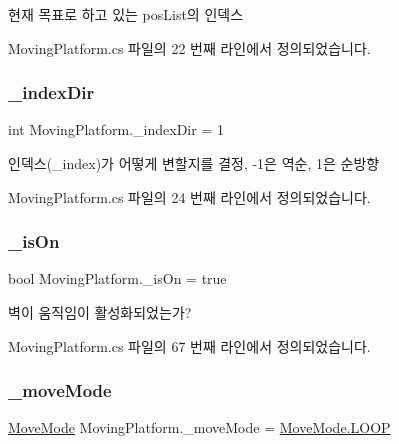현재 목표로 하고 있는 pos\+List의 인덱스 



Moving\+Platform.\+cs 파일의 22 번째 라인에서 정의되었습니다.

\mbox{\label{class_moving_platform_a885973335ac91f8c34289d38f2d88d93}} 
\subsubsection{\texorpdfstring{\_indexDir}{\_indexDir}}
{\footnotesize\ttfamily int Moving\+Platform.\+\_\+index\+Dir = 1\hspace{0.3cm}{\ttfamily [private]}}



인덱스(\+\_\+index)가 어떻게 변할지를 결정, -\/1은 역순, 1은 순방향 



Moving\+Platform.\+cs 파일의 24 번째 라인에서 정의되었습니다.

\mbox{\label{class_moving_platform_a6721f91607e56294fb807a00ccfaafad}} 
\subsubsection{\texorpdfstring{\_isOn}{\_isOn}}
{\footnotesize\ttfamily bool Moving\+Platform.\+\_\+is\+On = true\hspace{0.3cm}{\ttfamily [private]}}



벽이 움직임이 활성화되었는가? 



Moving\+Platform.\+cs 파일의 67 번째 라인에서 정의되었습니다.

\mbox{\label{class_moving_platform_a47308284bdf720a8fe919a69f2c0019b}} 
\subsubsection{\texorpdfstring{\_moveMode}{\_moveMode}}
{\footnotesize\ttfamily \mbox{\hyperlink{class_moving_platform_a7b3427d2906069ecf4c39d69eee53653}{Move\+Mode}} Moving\+Platform.\+\_\+move\+Mode = \mbox{\hyperlink{class_moving_platform_a7b3427d2906069ecf4c39d69eee53653a9159b3578e4e1eb31ffdf90acd6f6e40}{Move\+Mode.\+L\+O\+OP}}}




